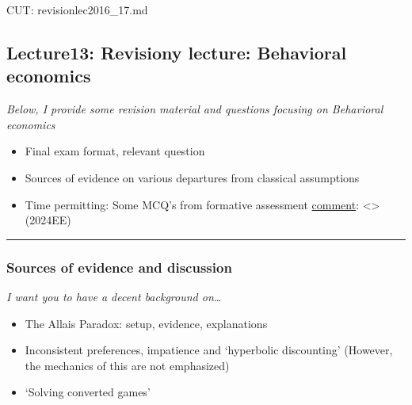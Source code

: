 \documentclass[]{article}
\providecommand{\tightlist}{%
  \setlength{\itemsep}{0pt}\setlength{\parskip}{0pt}}
\begin{document}
CUT: revisionlec2016\_17.md

\hypertarget{lecture13-revisiony-lecture-behavioral-economics}{%
\subsection{Lecture13: Revisiony lecture: Behavioral economics}\label{lecture13-revisiony-lecture-behavioral-economics}}

\emph{Below, I provide some revision material and questions focusing on Behavioral economics}

\begin{itemize}
\item
  Final exam format, relevant question
\item
  Sources of evidence on various departures from classical assumptions
\end{itemize}

\begin{itemize}
\tightlist
\item
  Time permitting: Some MCQ's from formative assessment
  \href{}{comment}: \textless{}\textgreater{} (2024EE)
\end{itemize}

\begin{center}\rule{0.5\linewidth}{\linethickness}\end{center}

\hypertarget{sources-of-evidence-and-discussion}{%
\subsubsection{Sources of evidence and discussion}\label{sources-of-evidence-and-discussion}}

\emph{I want you to have a decent background on\ldots{}}

\begin{itemize}
\tightlist
\item
  The Allais Paradox: setup, evidence, explanations
\end{itemize}

\bigskip

\begin{itemize}
\tightlist
\item
  Inconsistent preferences, impatience and `hyperbolic discounting' (However, the mechanics of this are not emphasized)
\end{itemize}

\begin{itemize}
\tightlist
\item
  `Solving converted games'
\end{itemize}
\end{document}
